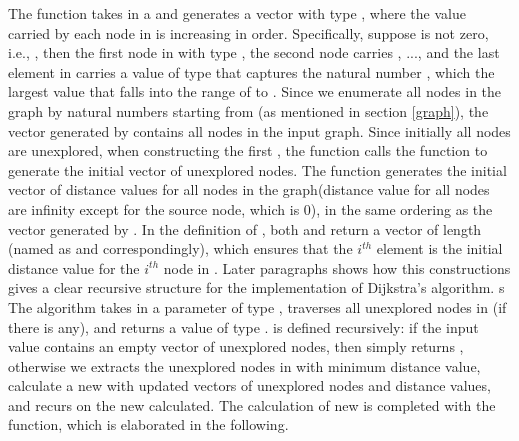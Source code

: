 The  function takes in a  and generates a vector  with type , where the  value carried by each node in  is increasing in order. Specifically, suppose  is not zero, i.e., , then the first node in   with type , the second node carries , ..., and the last element in  carries a value of type  that captures the natural number , which the largest  value that falls into the range of  to . Since we enumerate all nodes in the graph by natural numbers starting from  (as mentioned in section \ref{graph}), the vector generated by  contains all nodes in the input graph. Since initially all nodes are unexplored, when constructing the first , the  function calls the  function to generate the initial vector of unexplored nodes. The  function generates the initial vector of distance values for all nodes in the graph(distance value for all nodes are infinity except for the source node, which is 0), in the same ordering as the vector generated by . In the definition of , both  and  return a vector of length  (named as  and  correspondingly), which ensures that the $i^{th}$ element  is the initial distance value for the $i^{th}$ node in . Later paragraphs shows how this constructions gives a clear recursive structure for the implementation of Dijkstra's algorithm. s
\\

The  algorithm takes in a parameter  of type , traverses all unexplored nodes in (if there is any), and returns a value of type .  is defined recursively: if the input value  contains an empty vector of unexplored nodes, then simply returns , otherwise we extracts the unexplored nodes in  with minimum distance value, calculate a new  with updated vectors of unexplored nodes and distance values, and recurs on the new  calculated. The calculation of new  is completed with the  function, which is elaborated in the following. 
\\

